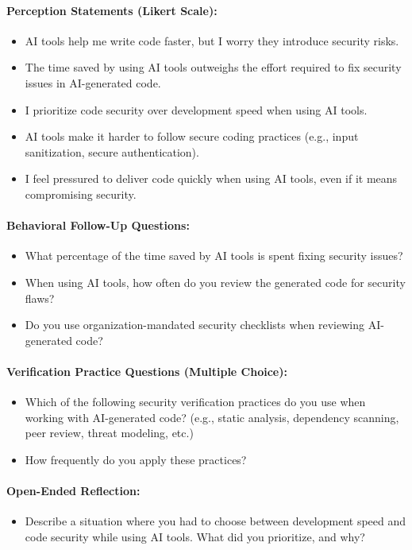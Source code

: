 \paragraph{Perception Statements (Likert Scale):}
\begin{itemize}
    \item AI tools help me write code faster, but I worry they introduce security risks.
    \item The time saved by using AI tools outweighs the effort required to fix security issues in AI-generated code.
    \item I prioritize code security over development speed when using AI tools.
    \item AI tools make it harder to follow secure coding practices (e.g., input sanitization, secure authentication).
    \item I feel pressured to deliver code quickly when using AI tools, even if it means compromising security.
\end{itemize}

\paragraph{Behavioral Follow-Up Questions:}
\begin{itemize}
    \item What percentage of the time saved by AI tools is spent fixing security issues?
    \item When using AI tools, how often do you review the generated code for security flaws?
    \item Do you use organization-mandated security checklists when reviewing AI-generated code?
\end{itemize}

\paragraph{Verification Practice Questions (Multiple Choice):}
\begin{itemize}
    \item Which of the following security verification practices do you use when working with AI-generated code? (e.g., static analysis, dependency scanning, peer review, threat modeling, etc.)
    \item How frequently do you apply these practices?
\end{itemize}

\paragraph{Open-Ended Reflection:}
\begin{itemize}
    \item Describe a situation where you had to choose between development speed and code security while using AI tools. What did you prioritize, and why?
\end{itemize}

